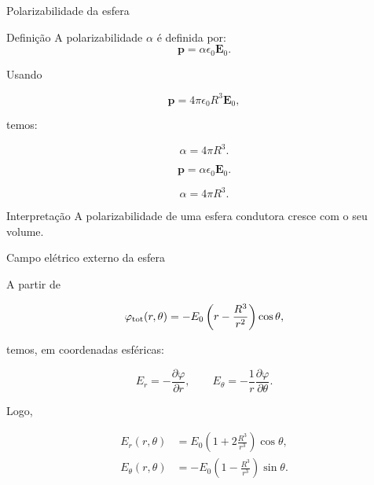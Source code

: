 \documentclass[aspectratio=169]{beamer}
\begin{document}
\begin{frame}{Polarizabilidade da esfera}

\begin{mybox}{Definição}
A polarizabilidade \(\alpha\) é definida por:
\[
\mathbf p=\alpha\epsilon_0\mathbf E_0.
\]
\end{mybox}

Usando

\[
\mathbf p=4\pi\epsilon_0R^3\mathbf E_0,
\]

temos:

\begin{eqbox}
\begin{equation}
\alpha=4\pi R^3.
\label{eq:polarizabilidade-esfera-resumo}
\end{equation}
\end{eqbox}



\end{frame}

\begin{frame}

\begin{eqbox}
\[
\mathbf p=\alpha\epsilon_0\mathbf E_0.
\]
\end{eqbox}

\begin{eqbox}
\begin{equation}
\alpha=4\pi R^3.
\label{eq:polarizabilidade-esfera}
\end{equation}
\end{eqbox}


\begin{alertblock}{Interpretação}
A polarizabilidade de uma esfera condutora cresce com o seu volume.
\end{alertblock}

\end{frame}
\begin{frame}{Campo elétrico externo da esfera}

\small

A partir de

\[
\varphi_{\rm tot}(r,\theta)
=
-E_0
\left(
r-\frac{R^3}{r^2}
\right)
\cos\theta,
\]

temos, em coordenadas esféricas:

\[
E_r=-\frac{\partial \varphi}{\partial r},
\qquad
E_\theta=-\frac{1}{r}\frac{\partial \varphi}{\partial \theta}.
\]

Logo,

\begin{eqbox}
\begin{align}
E_r(r,\theta)
&=
E_0
\left(
1+2\frac{R^3}{r^3}
\right)
\cos\theta,
\label{eq:Er-esfera}
\\
E_\theta(r,\theta)
&=
-E_0
\left(
1-\frac{R^3}{r^3}
\right)
\sin\theta.
\label{eq:Etheta-esfera}
\end{align}
\end{eqbox}

\end{frame}
\end{document}
